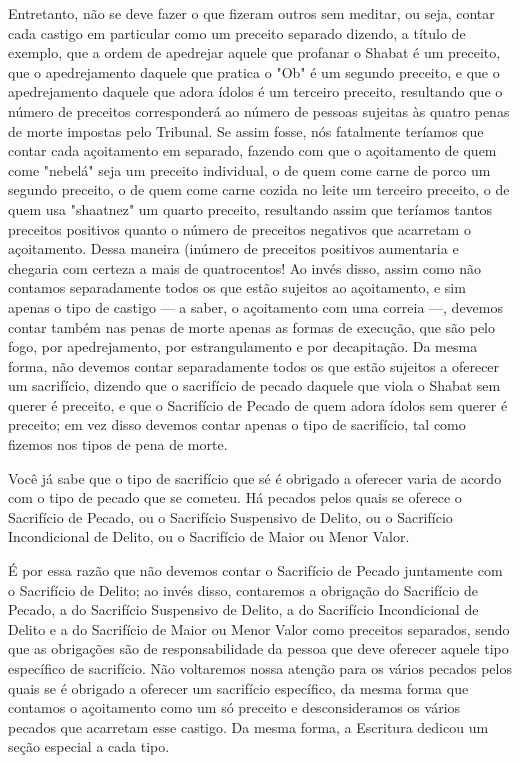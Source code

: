 \begin{itemize}
\begin{enumrate}
\begin{itemize}
Entretanto, não se deve fazer o que fizeram outros sem meditar, ou seja,
contar cada castigo em particular como um preceito separado dizendo, a
título de exemplo, que a ordem de apedrejar aquele que profanar o Shabat
é um preceito, que o apedrejamento daquele que pratica o "Ob" é um
segun­do preceito, e que o apedrejamento daquele que adora ídolos é um
terceiro preceito, resultando que o número de preceitos corresponderá ao
número de pessoas sujeitas às quatro penas de morte impostas pelo
Tribunal. Se assim fos­se, nós fatalmente teríamos que contar cada
açoitamento em separado, fazendo com que o açoitamento de quem come
"nebelá" seja um preceito individual, o de quem come carne de porco um
segundo preceito, o de quem come carne cozida no leite um terceiro
preceito, o de quem usa "shaatnez" um quarto pre­ceito, resultando assim
que teríamos tantos preceitos positivos quanto o núme­ro de preceitos
negativos que acarretam o açoitamento. Dessa maneira (inú­mero de
preceitos positivos aumentaria e chegaria com certeza a mais de
qua­trocentos! Ao invés disso, assim como não contamos separadamente
todos os que estão sujeitos ao açoitamento, e sim apenas o tipo de
castigo --- a saber, o açoitamento com uma correia ---, devemos contar
também nas penas de morte apenas as formas de execução, que são pelo
fogo, por apedrejamento, por es­trangulamento e por decapitação. Da
mesma forma, não devemos contar sepa­radamente todos os que estão
sujeitos a oferecer um sacrifício, dizendo que o sacrifício de pecado
daquele que viola o Shabat sem querer é preceito, e que o Sacrifício de
Pecado de quem adora ídolos sem querer é preceito; em vez disso devemos
contar apenas o tipo de sacrifício, tal como fizemos nos tipos de pena
de morte.

Você já sabe que o tipo de sacrifício que sé é obrigado a oferecer varia
de acordo com o tipo de pecado que se cometeu. Há pecados pelos quais se
oferece o Sacrifício de Pecado, ou o Sacrifício Suspensivo de Delito, ou
o Sacrifício Incondicional de Delito, ou o Sacrifício de Maior ou Menor
Valor.

É por essa razão que não devemos contar o Sacrifício de Pecado
juntamente com o Sacrifício de Delito; ao invés disso, contaremos a
obrigação do Sacrifí­cio de Pecado, a do Sacrifício Suspensivo de
Delito, a do Sacrifício Incondicio­nal de Delito e a do Sacrifício de
Maior ou Menor Valor como preceitos separa­dos, sendo que as obrigações
são de responsabilidade da pessoa que deve ofe­recer aquele tipo
específico de sacrifício. Não voltaremos nossa atenção para os vários
pecados pelos quais se é obrigado a oferecer um sacrifício específico,
da mesma forma que contamos o açoitamento como um só preceito e
descon­sideramos os vários pecados que acarretam esse castigo. Da mesma
forma, a Escritura dedicou um seção especial a cada tipo.


\end{itemize}
\end{enumrate}
\end{itemize}
